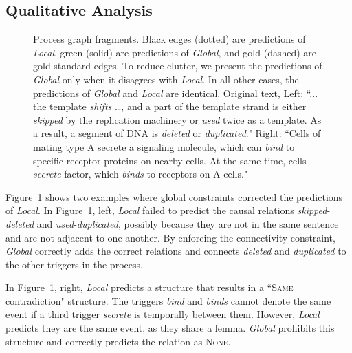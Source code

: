 \subsection{Qualitative Analysis} \label{subsec:analysis}
\begin{figure}[t]
\centering
{}
\caption{Process graph fragments. Black edges (dotted) are predictions of \emph{Local}, green (solid) are predictions of \emph{Global}, and gold (dashed) are gold standard edges. To reduce clutter, we present the predictions of \emph{Global} only when it disagrees with \emph{Local}. In all other cases, the predictions of \emph{Global} and \emph{Local} are identical. Original text, Left: ``... the template \emph{shifts} \ldots, and a part of the template strand is either \emph{skipped} by the replication machinery or \emph{used} twice as a template.
As a result, a segment of DNA is \emph{deleted} or \emph{duplicated}." Right: ``Cells of mating type A secrete a signaling molecule, which can \emph{bind} to specific receptor proteins on nearby cells. At the same time, cells \emph{secrete} factor, which \emph{binds} to receptors on A cells."}
\label{fig:graph}
\end{figure}

Figure~\ref{fig:graph} shows two examples where global constraints corrected the predictions of \emph{Local}. In Figure~\ref{fig:graph}, left, \emph{Local} failed to predict the causal relations \emph{skipped}-\emph{deleted} and \emph{used}-\emph{duplicated}, possibly because they are not in the same sentence and are not adjacent to one another. By enforcing the connectivity constraint, \emph{Global} correctly adds the correct relations and connects \emph{deleted} and \emph{duplicated} to the other triggers in the process.

In Figure~\ref{fig:graph}, right, \emph{Local} predicts a structure that results in a ``\textsc{Same} contradiction" structure. The triggers \emph{bind} and \emph{binds} cannot denote the same event if a third trigger \emph{secrete} is temporally between them. However, \emph{Local} predicts they are the same event, as they share a lemma. \emph{Global} prohibits this structure and correctly predicts the relation as \textsc{None}.

